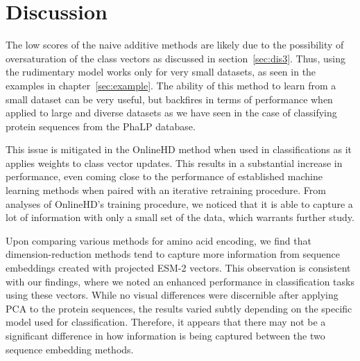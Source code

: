 \section{Discussion}
The low scores of the naive additive methods are likely due to the possibility of oversaturation of the class vectors as discussed in section~\ref{sec:dis3}. Thus, using the rudimentary model works only for very small datasets, as seen in the examples in chapter~\ref{sec:example}. The ability of this method to learn from a small dataset can be very useful, but backfires in terms of performance when applied to large and diverse datasets as we have seen in the case of classifying protein sequences from the PhaLP database.

This issue is mitigated in the OnlineHD method when used in classifications as it applies weights to class vector updates. This results in a substantial increase in performance, even coming close to the performance of established machine learning methods when paired with an iterative retraining procedure. From analyses of OnlineHD's training procedure, we noticed that it is able to capture a lot of information with only a small set of the data, which warrants further study.

Upon comparing various methods for amino acid encoding, we find that dimension-reduction methods tend to capture more information from sequence embeddings created with projected ESM-2 vectors. This observation is consistent with our findings, where we noted an enhanced performance in classification tasks using these vectors. While no visual differences were discernible after applying PCA to the protein sequences, the results varied subtly depending on the specific model used for classification. Therefore, it appears that there may not be a significant difference in how information is being captured between the two sequence embedding methods.